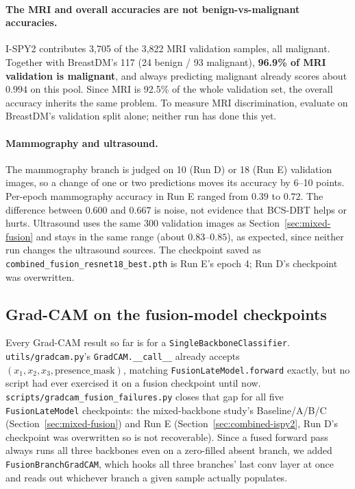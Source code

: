 \documentclass[11pt]{article}
\begin{document}
\paragraph{The MRI and overall accuracies are not benign-vs-malignant
accuracies.} I-SPY2 contributes 3{,}705 of the 3{,}822 MRI validation
samples, all malignant. Together with BreastDM's 117 (24 benign / 93
malignant), \textbf{96.9\% of MRI validation is malignant}, and always
predicting malignant already scores about $0.994$ on this pool. Since MRI
is 92.5\% of the whole validation set, the overall accuracy inherits the
same problem. To measure MRI discrimination, evaluate on BreastDM's
validation split alone; neither run has done this yet.

\paragraph{Mammography and ultrasound.} The mammography branch is judged
on 10 (Run D) or 18 (Run E) validation images, so a change of one or two
predictions moves its accuracy by 6--10 points. Per-epoch mammography
accuracy in Run E ranged from $0.39$ to $0.72$. The difference between
$0.600$ and $0.667$ is noise, not evidence that BCS-DBT helps or hurts.
Ultrasound uses the same 300 validation images as
Section~\ref{sec:mixed-fusion} and stays in the same range (about
$0.83$--$0.85$), as expected, since neither run changes the ultrasound
sources. The checkpoint saved as
\texttt{combined\_fusion\_resnet18\_best.pth} is Run E's epoch 4; Run D's
checkpoint was overwritten.

\subsection{Grad-CAM on the fusion-model checkpoints}
\label{sec:gradcam-fusion}

Every Grad-CAM result so far is for a \texttt{SingleBackboneClassifier}.
\nolinkurl{utils/gradcam.py}'s \texttt{GradCAM.\_\_call\_\_} already accepts
$(x_1, x_2, x_3, \text{presence\_mask})$, matching
\texttt{FusionLateModel.forward} exactly, but no script had ever exercised
it on a fusion checkpoint until now.
\nolinkurl{scripts/gradcam_fusion_failures.py} closes that gap for all five
\texttt{FusionLateModel} checkpoints: the
mixed-backbone study's Baseline/A/B/C (Section~\ref{sec:mixed-fusion}) and
Run E (Section~\ref{sec:combined-ispy2}, Run D's checkpoint was overwritten
so is not recoverable). Since a fused forward pass always runs all three
backbones even on a zero-filled absent branch, we added
\texttt{FusionBranchGradCAM}, which hooks all three branches' last conv
layer at once and reads out whichever branch a given sample actually
populates.
\end{document}
